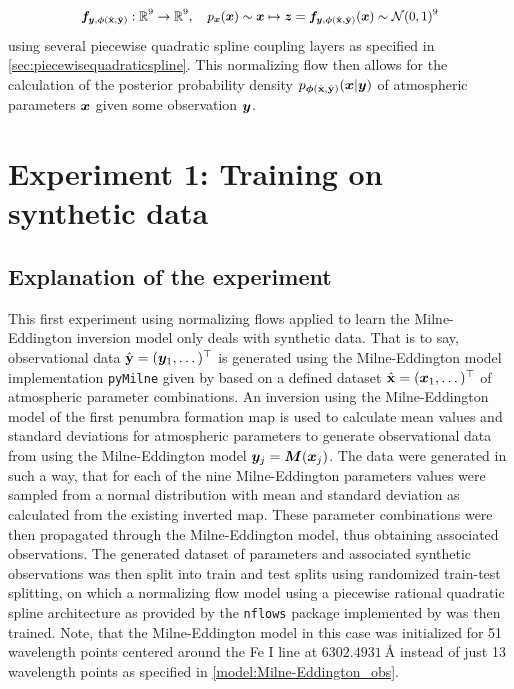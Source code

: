 \documentclass[a4paper,12pt]{report}
\begin{document}
\begin{align}\small\begin{aligned}
\bm{f}_{\bm{y},\bm{\phi}(\hat{\boldsymbol{\mathbf{x}}},\hat{\boldsymbol{\mathbf{y}}})}: \mathbb{R}^{9} \rightarrow \mathbb{R}^{9}, \quad p_{\bm{x}}(\bm{x}) \sim \bm{x} \mapsto \bm{z} = \bm{f}_{\bm{y},\bm{\phi}(\hat{\boldsymbol{\mathbf{x}}},\hat{\boldsymbol{\mathbf{y}}})}(\bm{x}) \sim  \mathcal{N}(0,1)^{9}
\end{aligned}\end{align} using several piecewise quadratic spline coupling layers as specified in \cref{sec:piecewisequadraticspline}. This normalizing flow then allows for the calculation of the posterior probability density $p_{\bm{\phi}(\hat{\boldsymbol{\mathbf{x}}},\hat{\boldsymbol{\mathbf{y}}})}(\bm{x}|\bm{y})$ of atmospheric parameters $\bm{x}$ given some observation $\bm{y}$.

\section{Experiment 1: Training on synthetic data}
\subsection{Explanation of the experiment}
This first experiment using normalizing flows applied to learn the Milne-Eddington inversion model only deals with synthetic data. That is to say, observational data $\hat{\boldsymbol{\mathbf{y}}} = (\bm{y}_1,\dots)^\top$ is generated using the Milne-Eddington model implementation \verb|pyMilne| given by \cite{LaCruzRodriguez.2019} based on a defined dataset $\hat{\boldsymbol{\mathbf{x}}} = (\bm{x}_1,\dots)^\top$ of atmospheric parameter combinations. An inversion using the Milne-Eddington model of the first penumbra formation map is used to calculate mean values and standard deviations for atmospheric parameters to generate observational data from using the Milne-Eddington model $\bm{y}_j = \bm{M}(\bm{x}_j)$. The data were generated in such a way, that for each of the nine Milne-Eddington parameters values were sampled from a normal distribution with mean and standard deviation as calculated from the existing inverted map. These parameter combinations were then propagated through the Milne-Eddington model, thus obtaining associated observations. The generated dataset of parameters and associated synthetic observations was then split into train and test splits using randomized train-test splitting, on which a normalizing flow model using a piecewise rational quadratic spline architecture as provided by the \verb|nflows| package implemented by \cite{Durkan.10.06.2019} was then trained. Note, that the Milne-Eddington model in this case was initialized for 51 wavelength points centered around the Fe I line at $\SI{6302.4931}{\angstrom}$ instead of just 13 wavelength points as specified in \cref{model:Milne-Eddington_obs}.
\end{document}
